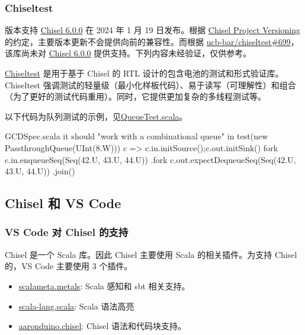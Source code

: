\documentclass[xcolor=table,dvipsnames,svgnames,aspectratio=169]{ctexbeamer}
\begin{document}
\begin{frame}
  \frametitle{Chiseltest}
  \begin{alertblock}{版本支持}
    \href{https://github.com/chipsalliance/chisel/releases/tag/v6.0.0}{Chisel 6.0.0} 在 2024 年 1 月 19 日发布。根据 \href{https://www.chisel-lang.org/docs/appendix/versioning}{Chisel Project Versioning} 的约定，主要版本更新不会提供向前的兼容性。而根据 \href{https://github.com/ucb-bar/chiseltest/issues/699}{ucb-bar/chiseltest\#699}，该库尚未对 \href{https://github.com/chipsalliance/chisel/releases/tag/v6.0.0}{Chisel 6.0.0} 提供支持。下列内容未经验证，仅供参考。
    \end{alertblock}

    \href{https://github.com/ucb-bar/chiseltest/}{Chiseltest} 是用于基于 Chisel 的 RTL 设计的包含电池的测试和形式验证库。 Chiseltest 强调测试的轻量级（最小化样板代码）、易于读写（可理解性）和组合（为了更好的测试代码重用）。同时，它提供更加复杂的多线程测试等。

    以下代码为队列测试的示例，见\href{https://github.com/ucb-bar/chiseltest/blob/0783f2789981c340e7486578c6210ed8b97c4ec2/src/test/scala/chiseltest/tests/QueueTest.scala\#L48C3-L59C4}{QueueTest.scala}。

    \begin{codeblock}[language=scala]{GCDSpec.scala}
it should "work with a combinational queue" in {
  test(new PassthroughQueue(UInt(8.W))) { c =>
    c.in.initSource();c.out.initSink()
    fork {
      c.in.enqueueSeq(Seq(42.U, 43.U, 44.U))
    }.fork {
      c.out.expectDequeueSeq(Seq(42.U, 43.U, 44.U))
    }.join()
  }
} 
  \end{codeblock}
\end{frame}


\subsection{Chisel 和 VS Code}

\begin{frame}
  \frametitle{VS Code 对 Chisel 的支持}
  Chisel 是一个 Scala 库。因此 Chisel 主要使用 Scala 的相关插件。为支持 Chisel 的，VS Code 主要使用 3 个插件。
  \begin{itemize}
    \item \href{https://marketplace.visualstudio.com/items?itemName=scalameta.metals}{scalameta.metals}: Scala 感知和 sbt 相关支持。
    \item \href{https://marketplace.visualstudio.com/items?itemName=scala-lang.scala}{scala-lang.scala}: Scala 语法高亮
    \item \href{https://marketplace.visualstudio.com/items?itemName=aaronduino.chisel}{aaronduino.chisel}: Chisel 语法和代码块支持。
  \end{itemize}
\end{frame}
\end{document}

